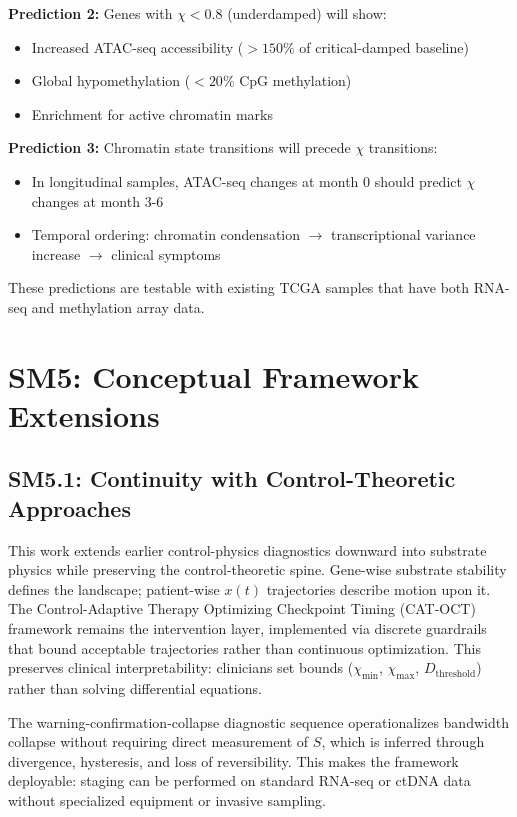 \documentclass[11pt,letterpaper]{article}
\begin{document}
\textbf{Prediction 2:} Genes with $\chi < 0.8$ (underdamped) will show:
\begin{itemize}
\item Increased ATAC-seq accessibility ($>150\%$ of critical-damped baseline)
\item Global hypomethylation ($<20\%$ CpG methylation)
\item Enrichment for active chromatin marks
\end{itemize}

\textbf{Prediction 3:} Chromatin state transitions will precede $\chi$ transitions:
\begin{itemize}
\item In longitudinal samples, ATAC-seq changes at month 0 should predict $\chi$ changes at month 3-6
\item Temporal ordering: chromatin condensation $\to$ transcriptional variance increase $\to$ clinical symptoms
\end{itemize}

These predictions are testable with existing TCGA samples that have both RNA-seq and methylation array data.

\section{SM5: Conceptual Framework Extensions}

\subsection{SM5.1: Continuity with Control-Theoretic Approaches}

This work extends earlier control-physics diagnostics downward into substrate physics while preserving the control-theoretic spine. Gene-wise substrate stability defines the landscape; patient-wise $x(t)$ trajectories describe motion upon it. The Control-Adaptive Therapy Optimizing Checkpoint Timing (CAT-OCT) framework remains the intervention layer, implemented via discrete guardrails that bound acceptable trajectories rather than continuous optimization. This preserves clinical interpretability: clinicians set bounds ($\chi_{\text{min}}$, $\chi_{\text{max}}$, $D_{\text{threshold}}$) rather than solving differential equations.

The warning-confirmation-collapse diagnostic sequence operationalizes bandwidth collapse without requiring direct measurement of $S$, which is inferred through divergence, hysteresis, and loss of reversibility. This makes the framework deployable: staging can be performed on standard RNA-seq or ctDNA data without specialized equipment or invasive sampling.
\end{document}
